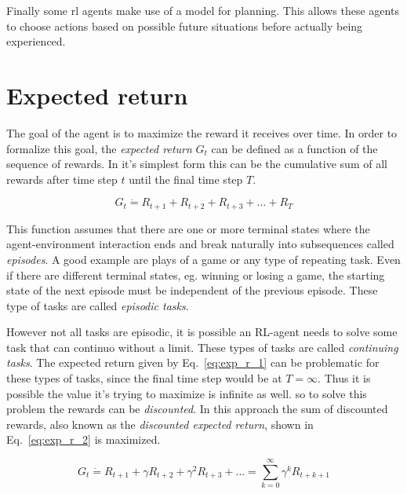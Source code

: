 Finally some \gls{rl} agents make use of a model for planning. This allows these agents to choose actions based on possible future situations before actually being experienced.


\section{Expected return}
The goal of the agent is to maximize the reward it receives over time. In order to formalize this goal, the \emph{expected return} $G_t$ can be defined as a function of the sequence of rewards. In it's simplest form this can be the cumulative sum of all rewards after time step $t$ until the final time step $T$.

\begin{equation}
  G_t \dot{=} R_{t+1} + R_{t+2} + R_{t+3} + \ldots + R_{T}
  \label{eq:exp_r_1}
\end{equation}

This function assumes that there are one or more terminal states where the agent-environment interaction ends and break naturally into subsequences called \emph{episodes}. A good example are plays of a game or any type of repeating task. Even if there are different terminal states, eg. winning or losing a game, the starting state of the next episode must be independent of the previous episode. These type of tasks are called \emph{episodic tasks}. 

However not all tasks are episodic, it is possible an RL-agent needs to solve some task that can continuo without a limit. These types of tasks are called \emph{continuing tasks}. The expected return given by Eq.~\ref{eq:exp_r_1} can be problematic for these types of tasks, since the final time step would be at $T=\infty$. Thus it is possible the value it's trying to maximize is infinite as well. so to solve this problem the rewards can be \emph{discounted}. In this approach the sum of discounted rewards, also known as the \emph{discounted expected return}, shown in Eq.~\ref{eq:exp_r_2} is maximized.

\begin{equation}
  G_t \dot{=} R_{t+1} + \gamma R_{t+2} + \gamma^2 R_{t+3} + \ldots = \sum_{k=0}^{\infty}\gamma^kR_{t+k+1}
  \label{eq:exp_r_2}
\end{equation}

